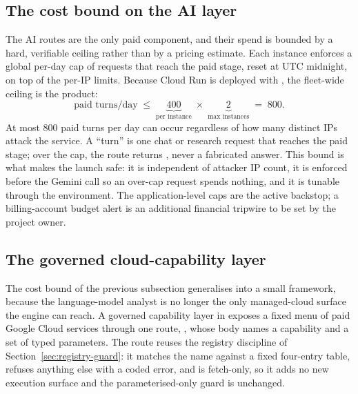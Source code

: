 \subsection{The cost bound on the AI layer}
\label{sec:cost-bound}

The AI routes are the only paid component, and their spend is bounded by a hard,
verifiable ceiling rather than by a pricing estimate. Each instance enforces a
global per-day cap of  requests that reach the paid
stage, reset at UTC midnight, on top of the per-IP limits. Because Cloud Run is
deployed with , the fleet-wide ceiling is the product:
\[
  \text{paid turns/day} \;\le\; \underbrace{400}_{\text{per instance}}
  \;\times\; \underbrace{2}_{\text{max instances}} \;=\; 800 .
\]
At most 800 paid turns per day can occur regardless of how many distinct IPs attack
the service. A ``turn'' is one chat or research request that reaches the paid stage;
over the cap, the route returns , never a fabricated
answer. This bound is what makes the launch safe: it is independent of attacker IP
count, it is enforced before the Gemini call so an over-cap request spends nothing,
and it is tunable through the environment. The application-level caps are the active
backstop; a billing-account budget alert is an additional financial tripwire to be
set by the project owner.

\subsection{The governed cloud-capability layer}
\label{sec:capability-layer}

The cost bound of the previous subsection generalises into a small framework, because
the language-model analyst is no longer the only managed-cloud surface the engine can
reach. A governed capability layer in  exposes a
fixed menu of paid Google Cloud services through one route, ,
whose body names a capability and a set of typed parameters. The route reuses the registry
discipline of Section~\ref{sec:registry-guard}: it matches the name against a fixed
four-entry table, refuses anything else with a coded error, and is fetch-only, so it adds
no new execution surface and the parameterised-only guard is unchanged.

